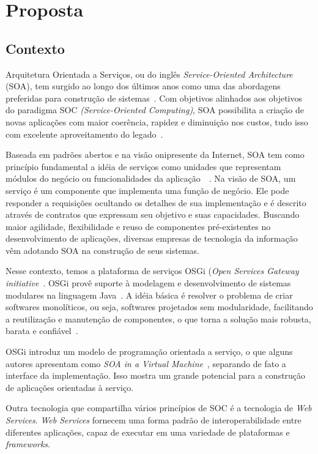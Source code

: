 \chapter{Proposta}
\section{Contexto}
\label{pr:contex}

Arquitetura Orientada a Serviços, ou do inglês \textit{Service-Oriented Architecture} (SOA), tem surgido ao longo dos últimos anos como uma das abordagens preferidas para construção de sistemas~\cite{erl2008soa}. Com objetivos alinhados aos objetivos do paradigma SOC \textit{(Service-Oriented Computing)}, SOA possibilita a criação de novas aplicações com maior coerência, rapidez e diminuição nos custos, tudo isso com excelente aproveitamento do legado~\cite{erl2008soa}.

Baseada em padrões abertos e na visão onipresente da Internet, SOA tem como princípio fundamental a idéia de serviços como unidades que representam módulos do negócio ou funcionalidades da aplicação~\cite{erl2008soa}~\cite{imb2007soa}. Na visão de SOA, um serviço é um componente que implementa uma função de negócio. Ele pode responder a requisições ocultando os detalhes de sua implementação e é descrito através de contratos que expressam seu objetivo e suas capacidades. Buscando maior agilidade, flexibilidade e reuso de componentes pré-existentes no desenvolvimento de aplicações, diversas empresas de tecnologia da informação vêm adotando SOA na construção de seus sistemas.

Nesse contexto, temos a plataforma de serviços OSGi (\textit{Open Services Gateway initiative}~\cite{alliance2007osgi}. OSGi provê suporte à modelagem e desenvolvimento de sistemas modulares na linguagem Java~\cite{hall2010osgi}. A idéia básica é resolver o problema de criar softwares monolíticos, ou seja, softwares projetados sem modularidade, facilitando a reutilização e manutenção de  componentes, o que torna a solução mais robusta, barata e confiável~\cite{davis2009open}.

OSGi introduz um modelo de programação orientada a serviço, o que alguns autores apresentam como \textit{SOA in a Virtual Machine}~\cite{hall2010osgi}, separando de fato a interface da implementação. Isso mostra um grande potencial para a construção de aplicações orientadas à serviço.

Outra tecnologia que compartilha vários princípios de SOC é a tecnologia de \textit{Web Services}. \textit{Web Services} fornecem uma forma padrão de interoperabilidade entre diferentes aplicações, capaz de executar em uma variedade de plataformas e \textit{frameworks}.~\cite{w3c2002ws}

